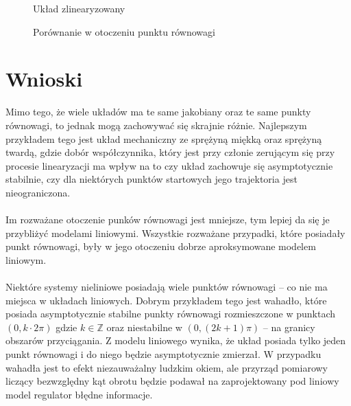 \documentclass[a4paper, 10pt]{article}
\begin{document}
				
				\begin{figure}[H]
					\centering
					\def \svgwidth{0.8\columnwidth}
					
					\caption{Układ zlinearyzowany}
				\end{figure}\noindent
				
				
				\begin{figure}[H]
					\centering
					\def \svgwidth{0.8\columnwidth}
					
					\caption{Porównanie w otoczeniu punktu równowagi}
				\end{figure}\noindent
				
				
				
				
	\section{Wnioski}
		Mimo tego, że wiele układów ma te same jakobiany oraz te same punkty równowagi, to jednak mogą zachowywać się skrajnie różnie. Najlepszym przykładem tego jest układ mechaniczny ze sprężyną miękką oraz sprężyną twardą,
		gdzie dobór współczynnika, który jest przy członie zerującym się przy procesie linearyzacji ma wpływ na to czy układ zachowuje się asymptotycznie stabilnie, czy dla niektórych punktów startowych jego trajektoria jest
		nieograniczona.
		\\ \\
		Im rozważane otoczenie punków równowagi jest mniejsze, tym lepiej da się je przybliżyć modelami liniowymi. Wszystkie rozważane przypadki, które posiadały punkt równowagi, były w jego otoczeniu dobrze aproksymowane
		modelem liniowym.
		\\ \\
		Niektóre systemy nieliniowe posiadają wiele punktów równowagi -- co nie ma miejsca w układach liniowych. Dobrym przykładem tego jest wahadło, które posiada asymptotycznie stabilne punkty równowagi rozmieszczone w punktach
		$(0, k \cdot 2\pi)$ gdzie $k \in \mathbb{Z}$ oraz niestabilne w $(0, (2k + 1)\pi)$ -- na granicy obszarów przyciągania. Z modelu liniowego wynika, że układ posiada tylko jeden punkt równowagi i do niego będzie asymptotycznie
		zmierzał. W przypadku wahadła jest to efekt niezauważalny ludzkim okiem, ale przyrząd pomiarowy liczący bezwzględny kąt obrotu będzie podawał na zaprojektowany pod liniowy model regulator błędne informacje.
\end{document}
